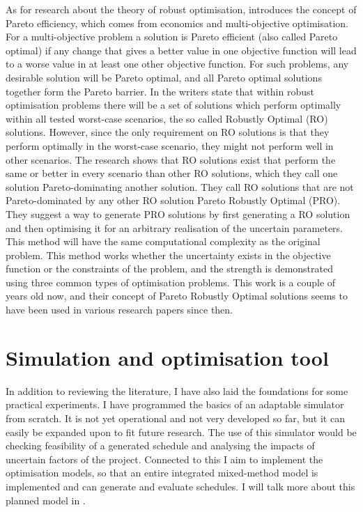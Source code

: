 \documentclass[a4paper,12pt]{article}
\begin{document}
As for research about the theory of robust optimisation, \cite{iancu2013pareto} introduces the concept of Pareto efficiency, which comes from economics and multi-objective optimisation. For a multi-objective problem a solution is Pareto efficient (also called Pareto optimal) if any change that gives a better value in one objective function will lead to a worse value in at least one other objective function. For such problems, any desirable solution will be Pareto optimal, and all Pareto optimal solutions together form the Pareto barrier. In \cite{iancu2013pareto} the writers state that within robust optimisation problems there will be a set of solutions which perform optimally within all tested worst-case scenarios, the so called Robustly Optimal (RO) solutions. However, since the only requirement on RO solutions is that they perform optimally in the worst-case scenario, they might not perform well in other scenarios. The research shows that RO solutions exist that perform the same or better in every scenario than other RO solutions, which they call one solution Pareto-dominating another solution. They call RO solutions that are not Pareto-dominated by any other RO solution Pareto Robustly Optimal (PRO). They suggest a way to generate PRO solutions by first generating a RO solution and then optimising it for an arbitrary realisation of the uncertain parameters. This method will have the same computational complexity as the original problem. This method works whether the uncertainty exists in the objective function or the constraints of the problem, and the strength is demonstrated using three common types of optimisation problems. This work is a couple of years old now, and their concept of Pareto Robustly Optimal solutions seems to have been used in various research papers since then. 

\pagebreak

\section{Simulation and optimisation tool} \label{s:sim}
In addition to reviewing the literature, I have also laid the foundations for some practical experiments. I have programmed the basics of an adaptable simulator from scratch. It is not yet operational and not very developed so far, but it can easily be expanded upon to fit future research. The use of this simulator would be checking feasibility of a generated schedule and analysing the impacts of uncertain factors of the project. Connected to this I aim to implement the optimisation models, so that an entire integrated mixed-method model is implemented and can generate and evaluate schedules. I will talk more about this planned model in .
\end{document}
